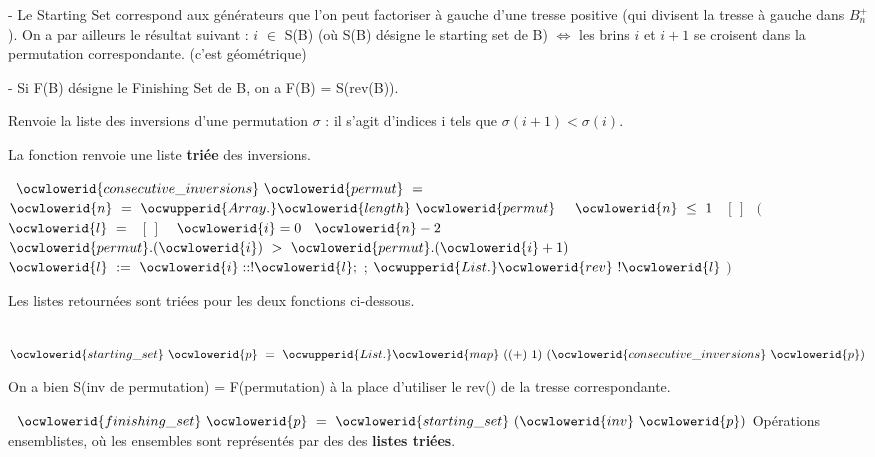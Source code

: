 \documentclass[12pt]{article}
\begin{document}
      - Le Starting Set correspond aux générateurs que l'on peut factoriser à gauche d'une tresse positive
        (qui divisent la tresse à gauche dans $B_n^+$).
        On a par ailleurs le résultat suivant : $i$ $\in$ S(B) (où S(B) désigne le starting set de B) $\Leftrightarrow$ les brins $i$ et $i+1$ se croisent dans la permutation correspondante. (c'est géométrique)

      - Si F(B) désigne le Finishing Set de B, on a F(B) = S(rev(B)).

\ocweol
\ocwindent{0.00em}
Renvoie la liste des inversions d'une permutation $\sigma$ : il s'agit
   d'indices i tels que $\sigma(i+1) < \sigma(i)$.

   La fonction renvoie une liste \textbf{triée}
   des inversions.

\ocweol
\label{Permutation.ml:4399}%
\medskip
\ocwbegincode{}\ocwindent{0.00em}
~$\ocwlowerid{consecutive\_inversions}~\ocwlowerid{permut}~=$\ocweol
\ocwindent{2.00em}
~$\ocwlowerid{n}~=~\ocwupperid{Array.}\ocwlowerid{length}~\ocwlowerid{permut}~$\ocweol
\ocwindent{2.00em}
~$\ocwlowerid{n}~\le{}~1~$~$[\,]~$~$($\ocweol
\ocwindent{4.00em}
~$\ocwlowerid{l}~=~$~$[\,]~$\ocweol
\ocwindent{4.00em}
~$\ocwlowerid{i}=0~$~$\ocwlowerid{n}-2~$\ocweol
\ocwindent{6.00em}
~$\ocwlowerid{permut}.(\ocwlowerid{i})~>~\ocwlowerid{permut}.(\ocwlowerid{i}+1)$\ocweol
\ocwindent{6.00em}
~$\ocwlowerid{l}~:=~\ocwlowerid{i}::!\ocwlowerid{l};$\ocweol
\ocwindent{4.00em}
;\ocweol
\ocwindent{4.00em}
$\ocwupperid{List.}\ocwlowerid{rev}~!\ocwlowerid{l}$\ocweol
\ocwindent{2.00em}
$)$\medskip

\ocwendcode{}\ocwindent{0.00em}
Les listes retournées sont triées pour les deux fonctions ci-dessous.

\ocweol
\label{Permutation.ml:4741}%
\medskip
\ocwbegincode{}\ocwindent{0.00em}
~$\ocwlowerid{starting\_set}~\ocwlowerid{p}~=~\ocwupperid{List.}\ocwlowerid{map}~((+)~1)~(\ocwlowerid{consecutive\_inversions}~\ocwlowerid{p})$\medskip

\ocwendcode{}\ocwindent{0.00em}
On a bien S(inv de permutation) = F(permutation) à la place d'utiliser
   le rev() de la tresse correspondante.

\ocweol
\label{Permutation.ml:4927}%
\medskip
\ocwbegincode{}\ocwindent{0.00em}
~$\ocwlowerid{finishing\_set}~\ocwlowerid{p}~=~\ocwlowerid{starting\_set}~(\ocwlowerid{inv}~\ocwlowerid{p})$\ocweol
\ocwendcode{}\allowbreak\ocwsection
\label{Permutation.ml:4975}%
Opérations ensemblistes, où les ensembles sont représentés par des
   des \textbf{listes triées}.
\end{document}
